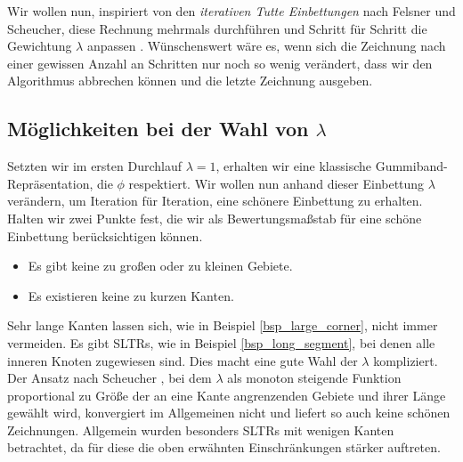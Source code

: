 Wir wollen nun, inspiriert von den \textit{iterativen Tutte Einbettungen} nach Felsner und Scheucher, diese Rechnung mehrmals durchführen und Schritt für Schritt die Gewichtung $\lambda$ anpassen \cite{fs17}. Wünschenswert wäre es, wenn sich die Zeichnung nach einer gewissen Anzahl an Schritten nur noch so wenig verändert, dass wir den Algorithmus abbrechen können und die letzte Zeichnung ausgeben.

\subsection{Möglichkeiten bei der Wahl von $\lambda$}

Setzten wir im ersten Durchlauf $\lambda = 1$, erhalten wir eine klassische Gummiband-Repräsentation, die $\phi$ respektiert. Wir wollen nun anhand dieser Einbettung $\lambda$ verändern, um Iteration für Iteration, eine \glqq schönere\grqq{ } Einbettung zu erhalten. Halten wir zwei Punkte fest, die wir als Bewertungsmaßstab für eine schöne Einbettung berücksichtigen können.

\begin{itemize}
\item Es gibt keine zu großen oder zu kleinen Gebiete.
\item Es existieren keine zu kurzen Kanten.
\end{itemize}

Sehr lange Kanten lassen sich, wie in Beispiel \ref{bsp_large_corner}, nicht immer vermeiden. Es gibt SLTRs, wie in Beispiel \ref{bsp_long_segment}, bei denen alle inneren Knoten zugewiesen sind. Dies macht eine gute Wahl der $\lambda$ kompliziert. Der Ansatz nach Scheucher \cite{fs17}, bei dem $\lambda$ als monoton steigende Funktion proportional zu Größe der an eine Kante angrenzenden Gebiete und ihrer Länge gewählt wird, konvergiert im Allgemeinen nicht und liefert so auch keine schönen Zeichnungen. Allgemein wurden besonders SLTRs mit wenigen Kanten betrachtet, da für diese die oben erwähnten Einschränkungen stärker auftreten.

